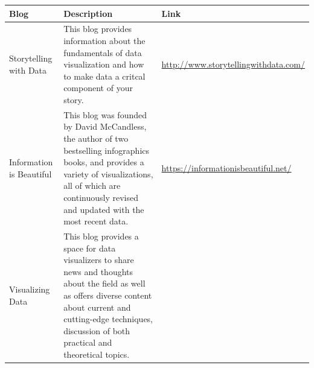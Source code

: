 \documentclass[]{book}
\begin{document}
\begin{longtable}[]{@{}lll@{}}
\toprule
\begin{minipage}[b]{0.07\columnwidth}\raggedright
\textbf{Blog}\strut
\end{minipage} & \begin{minipage}[b]{0.77\columnwidth}\raggedright
\textbf{Description}\strut
\end{minipage} & \begin{minipage}[b]{0.07\columnwidth}\raggedright
\textbf{Link}\strut
\end{minipage}\tabularnewline
\midrule
\endhead
\begin{minipage}[t]{0.07\columnwidth}\raggedright
Storytelling with Data\strut
\end{minipage} & \begin{minipage}[t]{0.77\columnwidth}\raggedright
This blog provides information about the fundamentals of data visualization and how to make data a critcal component of your story.\strut
\end{minipage} & \begin{minipage}[t]{0.07\columnwidth}\raggedright
\url{http://www.storytellingwithdata.com/}\strut
\end{minipage}\tabularnewline
\begin{minipage}[t]{0.07\columnwidth}\raggedright
Information is Beautiful\strut
\end{minipage} & \begin{minipage}[t]{0.77\columnwidth}\raggedright
This blog was founded by David McCandless, the author of two bestselling infographics books, and provides a variety of visualizations, all of which are continuously revised and updated with the most recent data.\strut
\end{minipage} & \begin{minipage}[t]{0.07\columnwidth}\raggedright
\url{https://informationisbeautiful.net/}\strut
\end{minipage}\tabularnewline
\begin{minipage}[t]{0.07\columnwidth}\raggedright
Visualizing Data\strut
\end{minipage} & \begin{minipage}[t]{0.77\columnwidth}\raggedright
This blog provides a space for data visualizers to share news and thoughts about the field as well as offers diverse content about current and cutting-edge techniques, discussion of both practical and theoretical topics.\strut
\end{minipage} & \begin{minipage}[t]{0.07\columnwidth}\raggedright

\end{minipage}
\end{longtable}
\end{document}

